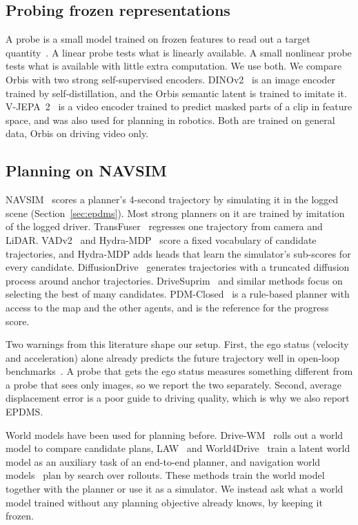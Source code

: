 \subsection{Probing frozen representations}
\label{sec:probing}

A probe is a small model trained on frozen features to read out a target
quantity~\cite{alain_probe}. A linear probe tests what is linearly available. A
small nonlinear probe tests what is available with little extra computation. We
use both. We compare Orbis with two strong self-supervised encoders.
DINOv2~\cite{dinov2} is an image encoder trained by self-distillation, and the
Orbis semantic latent is trained to imitate it. V-JEPA~2~\cite{vjepa2} is a video
encoder trained to predict masked parts of a clip in feature space, and was also
used for planning in robotics. Both are trained on general data, Orbis on driving
video only.

\subsection{Planning on NAVSIM}
\label{sec:planners}

NAVSIM~\cite{navsim1,navsim} scores a planner's 4-second trajectory by
simulating it in the logged scene (Section~\ref{sec:epdms}). Most strong
planners on it are trained by imitation of the logged driver.
TransFuser~\cite{transfuser} regresses one trajectory from camera and LiDAR.
VADv2~\cite{vadv2} and Hydra-MDP~\cite{hydra_mdp,hydra} score a fixed vocabulary
of candidate trajectories, and Hydra-MDP adds heads that learn the simulator's
sub-scores for every candidate. DiffusionDrive~\cite{diffusiondrive} generates
trajectories with a truncated diffusion process around anchor trajectories.
DriveSuprim~\cite{drivesuprim} and similar methods focus on selecting the best
of many candidates. PDM-Closed~\cite{pdm} is a rule-based planner with access to
the map and the other agents, and is the reference for the progress score.

Two warnings from this literature shape our setup. First, the ego status
(velocity and acceleration) alone already predicts the future trajectory well in
open-loop benchmarks~\cite{admlp,egostatus}. A probe that gets the ego status
measures something different from a probe that sees only images, so we report
the two separately. Second, average displacement error is a poor guide to
driving quality, which is why we also report EPDMS.

World models have been used for planning before. Drive-WM~\cite{drivewm} rolls
out a world model to compare candidate plans, LAW~\cite{law} and
World4Drive~\cite{world4drive} train a latent world model as an auxiliary task of
an end-to-end planner, and navigation world models~\cite{nwm} plan by search
over rollouts. These methods train the world model together with the planner or
use it as a simulator. We instead ask what a world model trained without any
planning objective already knows, by keeping it frozen.
